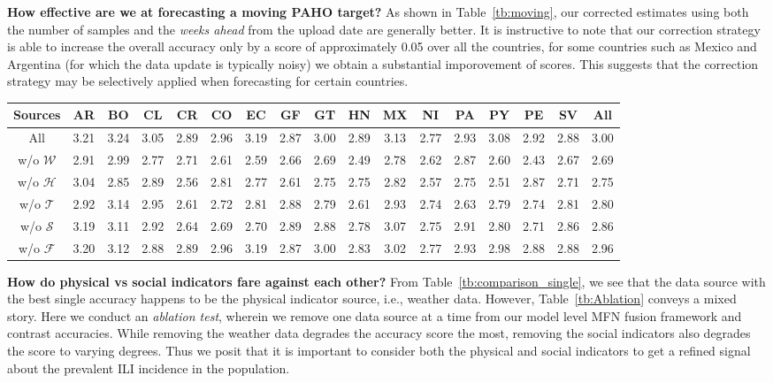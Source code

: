 {\noindent \textbf{How effective are we at forecasting a moving PAHO target?}} 
As shown in Table~\ref{tb:moving}, 
our
corrected estimates 
using both the number of samples and 
the {\it weeks ahead} from the upload date are generally better. It is instructive to note that
our correction strategy is
able to increase the overall accuracy only by a score of approximately 0.05 over all the countries, 
for some countries such as Mexico and Argentina (for which the data update is typically noisy) we obtain 
a substantial imporovement of scores. This suggests that the correction strategy may be selectively applied 
when forecasting for certain countries. 


\begin{table*}[H]
  \scriptsize
  \centering
\captionsetup{font=scriptsize}
  \caption{\label{tb:Ablation} Discovering importance of sources in Model level fusion on MFN 
  regressors by ablating one source at a time.}
\vspace{-1em}
\begin{tabular}{|*{17}{c|}}
\hline
Sources & AR & BO & CL & CR & CO & EC & GF & GT & HN & MX & NI & PA & PY & PE & SV & All\\
\hline 
\hline
All               & 3.21& 3.24& 3.05& 2.89& 2.96& 3.19& 2.87& 3.00& 2.89& 3.13& 2.77& 2.93& 3.08& 2.92& 2.88& 3.00\\
w/o $\mathcal{W}$ & 2.91& 2.99& 2.77& 2.71& 2.61& 2.59& 2.66& 2.69& 2.49& 2.78& 2.62& 2.87& 2.60& 2.43& 2.67& 2.69  \\
w/o $\mathcal{H}$ & 3.04& 2.85& 2.89& 2.56& 2.81& 2.77& 2.61& 2.75& 2.75& 2.82& 2.57& 2.75& 2.51& 2.87& 2.71& 2.75  \\
w/o $\mathcal{T}$ & 2.92& 3.14& 2.95& 2.61& 2.72& 2.81& 2.88& 2.79& 2.61& 2.93& 2.74& 2.63& 2.79& 2.74& 2.81& 2.80  \\
w/o $\mathcal{S}$ & 3.19& 3.11& 2.92& 2.64& 2.69& 2.70& 2.89& 2.88& 2.78& 3.07& 2.75& 2.91& 2.80& 2.71& 2.86& 2.86  \\
w/o $\mathcal{F}$ & 3.20& 3.12& 2.88& 2.89& 2.96& 3.19& 2.87& 3.00& 2.83& 3.02& 2.77& 2.93& 2.98& 2.88& 2.88& 2.96  \\
\hline
\end{tabular}
\end{table*}

{\noindent \textbf{How do physical vs social indicators fare against each other?}} 
From Table~\ref{tb:comparison_single}, we 
see that the data source with the best single accuracy happens to be the physical indicator source, i.e.,
weather data. However, Table~\ref{tb:Ablation} conveys a mixed story. Here we conduct an {\it ablation test},
wherein we remove one data source at a time from our model level MFN fusion framework and contrast accuracies.
While removing the weather data degrades the accuracy score the most, removing the social indicators also degrades
the score to varying degrees.
Thus we posit that it is important to consider both the physical 
and social indicators to get a refined signal about the prevalent ILI incidence in the population.

